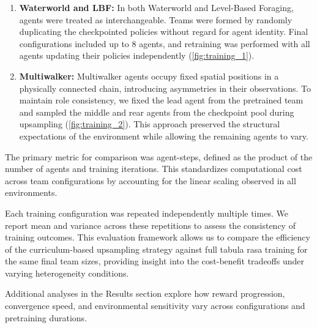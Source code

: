 \begin{enumerate}
    \item \textbf{Waterworld and LBF:}
    In both Waterworld and Level-Based Foraging, agents were treated as interchangeable. 
    Teams were formed by randomly duplicating the checkpointed policies without regard 
    for agent identity. Final configurations included up to 8 agents, and retraining was 
    performed with all agents updating their policies independently (\ref{fig:training_1}).
    \item \textbf{Multiwalker:}
    Multiwalker agents occupy fixed spatial positions in a physically connected chain, 
    introducing asymmetries in their observations. To maintain role consistency, 
    we fixed the lead agent from the pretrained team and sampled the middle and rear 
    agents from the checkpoint pool during upsampling (\ref{fig:training_2}). 
    This approach preserved the 
    structural expectations of the environment while allowing the remaining agents to vary. 
\end{enumerate}

The primary metric for comparison was agent-steps, defined as the product of the number of 
agents and training iterations. This standardizes computational cost across team configurations 
by accounting for the linear scaling observed in all environments.

Each training configuration was repeated independently multiple times. We report mean and 
variance across these repetitions to assess the consistency of training outcomes. 
This evaluation framework allows us to compare the efficiency of the curriculum-based 
upsampling strategy against full tabula rasa training for the same final team sizes, 
providing insight into the cost-benefit tradeoffs under varying heterogeneity conditions.

Additional analyses in the Results section explore how reward progression, convergence speed, 
and environmental sensitivity vary across configurations and pretraining durations.

